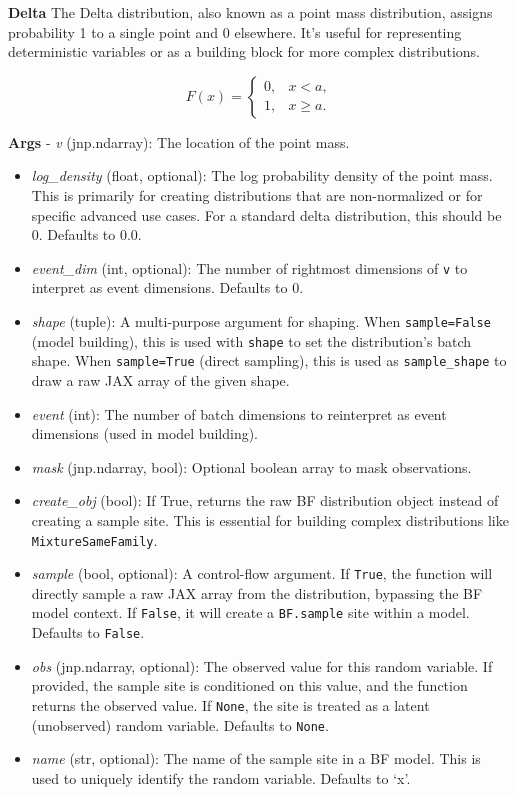 \documentclass[
  letterpaper,
  DIV=11,
  numbers=noendperiod]{scrartcl}
\begin{document}
\textbf{Delta} The Delta distribution, also known as a point mass
distribution, assigns probability 1 to a single point and 0 elsewhere.
It's useful for representing deterministic variables or as a building
block for more complex distributions.

\[   
F(x) =
\begin{cases}
0, & x < a, \\
1, & x \ge a.
\end{cases}
\]

\textbf{Args} - \emph{v} (jnp.ndarray): The location of the point mass.

\begin{itemize}
\item
  \emph{log\_density} (float, optional): The log probability density of
  the point mass. This is primarily for creating distributions that are
  non-normalized or for specific advanced use cases. For a standard
  delta distribution, this should be 0. Defaults to 0.0.
\item
  \emph{event\_dim} (int, optional): The number of rightmost dimensions
  of \texttt{v} to interpret as event dimensions. Defaults to 0.
\item
  \emph{shape} (tuple): A multi-purpose argument for shaping. When
  \texttt{sample=False} (model building), this is used with
  \texttt{shape} to set the distribution's batch shape. When
  \texttt{sample=True} (direct sampling), this is used as
  \texttt{sample\_shape} to draw a raw JAX array of the given shape.
\item
  \emph{event} (int): The number of batch dimensions to reinterpret as
  event dimensions (used in model building).
\item
  \emph{mask} (jnp.ndarray, bool): Optional boolean array to mask
  observations.
\item
  \emph{create\_obj} (bool): If True, returns the raw BF distribution
  object instead of creating a sample site. This is essential for
  building complex distributions like \texttt{MixtureSameFamily}.
\item
  \emph{sample} (bool, optional): A control-flow argument. If
  \texttt{True}, the function will directly sample a raw JAX array from
  the distribution, bypassing the BF model context. If \texttt{False},
  it will create a \texttt{BF.sample} site within a model. Defaults to
  \texttt{False}.
\item
  \emph{obs} (jnp.ndarray, optional): The observed value for this random
  variable. If provided, the sample site is conditioned on this value,
  and the function returns the observed value. If \texttt{None}, the
  site is treated as a latent (unobserved) random variable. Defaults to
  \texttt{None}.
\item
  \emph{name} (str, optional): The name of the sample site in a BF
  model. This is used to uniquely identify the random variable. Defaults
  to `x'.
\end{itemize}
\end{document}
